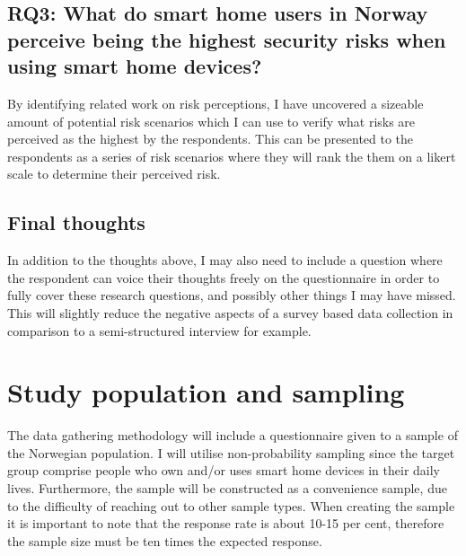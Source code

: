 \subsection*{RQ3: What do smart home users in Norway perceive being the highest security risks when using smart home devices?}
By identifying related work on risk perceptions, I have uncovered a sizeable amount of potential risk scenarios which I can use to verify what risks are perceived as the highest by the respondents. This can be presented to the respondents as a series of risk scenarios where they will rank the them on a likert scale to determine their perceived risk. 

\subsection*{Final thoughts}
In addition to the thoughts above, I may also need to include a question where the respondent can voice their thoughts freely on the questionnaire in order to fully cover these research questions, and possibly other things I may have missed. This will slightly reduce the negative aspects of a survey based data collection in comparison to a semi-structured interview for example. 

\section{Study population and sampling}
The data gathering methodology will include a questionnaire given to a sample of the Norwegian population. I will utilise non-probability sampling since the target group comprise people who own and/or uses smart home devices in their daily lives. Furthermore, the sample will be constructed as a convenience sample, due to the difficulty of reaching out to other sample types. When creating the sample it is important to note that the response rate is about 10-15 per cent, therefore the sample size must be ten times the expected response. 

